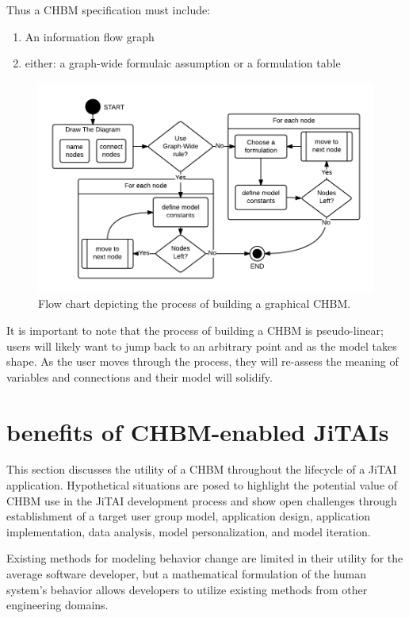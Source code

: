 \documentclass[runningheads,a4paper]{llncs}
\begin{document}
Thus a CHBM specification must include:
\begin{enumerate}
  \item An information flow graph
  \item either: a graph-wide formulaic assumption or a formulation table 
\end{enumerate}

\begin{figure}[!t]
  \centering
  \includegraphics[width=0.9\columnwidth]{img/HBM-build-process}
  \caption{Flow chart depicting the process of building a graphical CHBM.}
  \label{HBM-build-process}
\end{figure}

It is important to note that the process of building a CHBM is pseudo-linear; users will likely want to jump back to an arbitrary point and as the model takes shape. 
As the user moves through the process, they will re-assess the meaning of variables and connections and their model will solidify. 

\section{benefits of CHBM-enabled JiTAIs}
This section discusses the utility of a CHBM throughout the lifecycle of a JiTAI application.
Hypothetical situations are posed to highlight the potential value of CHBM use in the JiTAI development process and show open challenges through establishment of a target user group model, application design, application implementation, data analysis, model personalization, and model iteration.

Existing methods for modeling behavior change are limited in their utility for the average software developer, but a mathematical formulation of the human system's behavior allows developers to utilize existing methods from other engineering domains.
\end{document}
